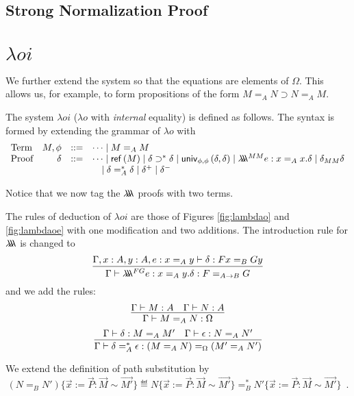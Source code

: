 





\subsection{Strong Normalization Proof}







\section{$\lambda o i$}

We further extend the system so that the equations are elements of $\Omega$.  This allows us, for example,
to form propositions of the form $M =_A N \supset N =_A M$.

The system $\lambda o i$ ($\lambda o$ with \emph{internal} equality) is defined as follows.  The
syntax is formed by extending the grammar of $\lambda o$ with
\[
\begin{array}{lrcl}
\text{Term} & M, \phi & ::= & \cdots \mid M =_A M \\
\text{Proof} & \delta & ::= & \cdots \mid \mathsf{ref} \left( {M} \right) \mid \delta \supset^* \delta \mid \mathsf{univ}_{{\phi} , {\phi}} \left( {\delta} , {\delta} \right) \mid \lambda \!\! \lambda \!\! \lambda^{MM} e : x =_A x . \delta \mid \delta_{MM} \delta\\
& & & \quad \mid \delta =^*_A \delta \mid \delta^+ \mid \delta^-
\end{array}
\]

Notice that we now tag the $\lambda \!\! \lambda \!\! \lambda$ proofs with two terms.

The rules of deduction of $\lambda o i$ are those of Figures \ref{fig:lambdao} and \ref{fig:lambdaoe} with one modification and two additions.  The introduction rule for $\lambda \!\! \lambda \!\! \lambda$ is changed to %
\[ \infer{\Gamma \vdash \triplelambda^{FG} e : x =_A y . \delta : F =_{A \rightarrow B} G}
{\Gamma, x : A, y : A, e : x =_A y \vdash \delta : F x =_B G y} \]
and we add the rules:
\[ \infer{\Gamma \vdash M =_A N : \Omega}{\Gamma \vdash M : A \quad \Gamma \vdash N : A} \]
\[ \infer{\Gamma \vdash \delta =^*_A \epsilon : (M =_A N) =_\Omega (M' =_A N')}
{\Gamma \vdash \delta : M =_A M' \quad \Gamma \vdash \epsilon : N =_A N'} \]

We extend the definition of path substitution by
\[ (N =_B N') \{ \vec{x} := \vec{P} : \vec{M} \sim \vec{M'} \}
\eqdef N \{ \vec{x} := \vec{P} : \vec{M} \sim \vec{M'} \} =_B^*
N' \{ \vec{x} := \vec{P} : \vec{M} \sim \vec{M'} \} \enspace . \]

